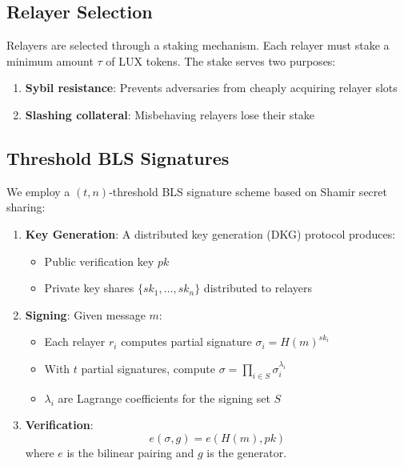 \documentclass[11pt,a4paper]{article}
\theoremstyle{definition}
\begin{document}
\subsection{Relayer Selection}

Relayers are selected through a staking mechanism. Each relayer must stake a minimum amount $\tau$ of LUX tokens. The stake serves two purposes:

\begin{enumerate}
    \item \textbf{Sybil resistance}: Prevents adversaries from cheaply acquiring relayer slots
    \item \textbf{Slashing collateral}: Misbehaving relayers lose their stake
\end{enumerate}

\subsection{Threshold BLS Signatures}

We employ a $(t, n)$-threshold BLS signature scheme based on Shamir secret sharing:

\begin{enumerate}
    \item \textbf{Key Generation}: A distributed key generation (DKG) protocol produces:
    \begin{itemize}
        \item Public verification key $pk$
        \item Private key shares $\{sk_1, \ldots, sk_n\}$ distributed to relayers
    \end{itemize}

    \item \textbf{Signing}: Given message $m$:
    \begin{itemize}
        \item Each relayer $r_i$ computes partial signature $\sigma_i = H(m)^{sk_i}$
        \item With $t$ partial signatures, compute $\sigma = \prod_{i \in S} \sigma_i^{\lambda_i}$
        \item $\lambda_i$ are Lagrange coefficients for the signing set $S$
    \end{itemize}

    \item \textbf{Verification}:
    \[
    e(\sigma, g) = e(H(m), pk)
    \]
    where $e$ is the bilinear pairing and $g$ is the generator.
\end{enumerate}
\end{document}
